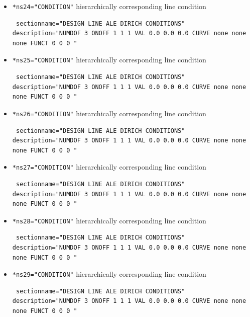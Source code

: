 \begin{itemize}
\item \verb|*ns24="CONDITION"| \qquad hierarchically corresponding line condition
\begin{small} \begin{verbatim} sectionname="DESIGN LINE ALE DIRICH CONDITIONS"
description="NUMDOF 3 ONOFF 1 1 1 VAL 0.0 0.0 0.0 CURVE none none none FUNCT 0 0 0 "
\end{verbatim} \end{small}

 \item \verb|*ns25="CONDITION"| \qquad hierarchically corresponding line condition
\begin{small} \begin{verbatim} sectionname="DESIGN LINE ALE DIRICH CONDITIONS"
description="NUMDOF 3 ONOFF 1 1 1 VAL 0.0 0.0 0.0 CURVE none none none FUNCT 0 0 0 "
\end{verbatim} \end{small}

\item \verb|*ns26="CONDITION"| \qquad hierarchically corresponding line condition
\begin{small} \begin{verbatim} sectionname="DESIGN LINE ALE DIRICH CONDITIONS"
description="NUMDOF 3 ONOFF 1 1 1 VAL 0.0 0.0 0.0 CURVE none none none FUNCT 0 0 0 "
\end{verbatim} \end{small}

 \item \verb|*ns27="CONDITION"| \qquad hierarchically corresponding line condition
\begin{small} \begin{verbatim} sectionname="DESIGN LINE ALE DIRICH CONDITIONS"
description="NUMDOF 3 ONOFF 1 1 1 VAL 0.0 0.0 0.0 CURVE none none none FUNCT 0 0 0 "
\end{verbatim} \end{small}

 \item \verb|*ns28="CONDITION"| \qquad hierarchically corresponding line condition
\begin{small} \begin{verbatim} sectionname="DESIGN LINE ALE DIRICH CONDITIONS"
description="NUMDOF 3 ONOFF 1 1 1 VAL 0.0 0.0 0.0 CURVE none none none FUNCT 0 0 0 "
\end{verbatim} \end{small}

 \item \verb|*ns29="CONDITION"| \qquad hierarchically corresponding line condition
\begin{small} \begin{verbatim} sectionname="DESIGN LINE ALE DIRICH CONDITIONS"
description="NUMDOF 3 ONOFF 1 1 1 VAL 0.0 0.0 0.0 CURVE none none none FUNCT 0 0 0 "
\end{verbatim} \end{small}


\end{itemize}
